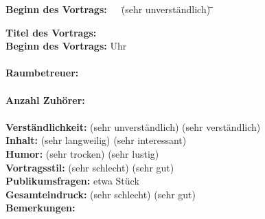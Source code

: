 \documentclass[a4paper,ngerman,14pt]{scrartcl}
\begin{document}
\begin{tabbing}
  \textbf{Beginn des Vortrags:}\ \ \ \=
  (sehr unverständlich) \=
  \checkbox \= \checkbox \= \checkbox \= \checkbox \= \checkbox \=
  \kill

  \textbf{Titel des Vortrags:} \> \longline \\
  \textbf{Beginn des Vortrags:} \> \shortline{} Uhr \\\\

  \textbf{Raumbetreuer:} \> \longline \\\\

  \textbf{Anzahl Zuhörer:} \> \shortline \\\\

  \textbf{Verständlichkeit:} \> (sehr unverständlich) \> \boxes \> (sehr
  verständlich) \\
  \textbf{Inhalt:} \> (sehr langweilig) \> \boxes \> (sehr interessant) \\
  \textbf{Humor:} \> (sehr trocken) \> \boxes \> (sehr lustig) \\
  \textbf{Vortragsstil:} \> (sehr schlecht) \> \boxes \> (sehr gut) \\
  \textbf{Publikumsfragen:} \> etwa \shortline{} Stück \\
  \textbf{Gesamteindruck:} \> (sehr schlecht) \> \boxes \> (sehr gut) \\
  \textbf{Bemerkungen:} \>
\end{tabbing}
\end{document}
